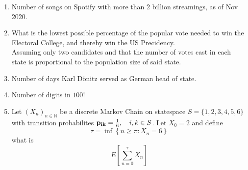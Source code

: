 \documentclass[12pt,a4paper]{article}
\begin{document}
\begin{enumerate}
  \item Number of songs on Spotify with more than 2 billion streamings, as of Nov 2020.
  
  \item What is the lowest possible percentage of the popular vote needed to win the Electoral College, and thereby win the US Precidency.\\   Assuming only two candidates and that the number of votes cast in each state is proportional to the population size of said state.
  
  \item Number of days Karl Dönitz served as German head of state.
  
  \item Number of digits in $100!$
  
  \item Let $(X_n)_{n \in \mathbb{N}}$ be a discrete Markov Chain on statespace $S = \{1,2,3,4,5,6\}$ 
  with transition probabilites $\bold{p_{ik}} = \frac{1}{6}, \quad i,k \in S$.
  Let $X_0 = 2$ and define 
  $$\tau = \inf\left\{ n \geq \pi : X_n = 6 \right\}$$
  what is 
  $$ E \left[ \sum_{n = 0}^{\tau}X_n \right] $$
  
  
  
 

\end{enumerate}
\end{document}
